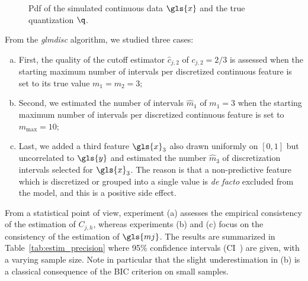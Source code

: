 \begin{figure}[!ht]
\centering
{}
\caption{\label{fig:exp_sim} Pdf of the simulated continuous data $\gls{x}$ and the true quantization $\q$.}
\end{figure}


From the \textit{glmdisc} algorithm, we studied three cases:
\begin{enumerate}[(a)]
    \item First, the quality of the cutoff estimator $\hat{c}_{j,2}$ of $c_{j,2} = 2/3$ is assessed when the starting maximum number of intervals per discretized continuous feature is set to its true value $m_1=m_2= 3$;
    \item Second, we estimated the number of intervals $\hat{m}_1$ of $m_1=3$ when the starting maximum number of intervals per discretized continuous feature is set to $m_{\text{max}} = 10$; 
    \item Last, we added a third feature $\gls{x}_3$ also drawn uniformly on $[0,1]$ but uncorrelated to $\gls{y}$ and estimated the number $\hat{m}_3$ of discretization intervals selected for $\gls{x}_3$. The reason is that a non-predictive feature which is discretized or grouped into a single value is \textit{de facto} excluded from the model, and this is a positive side effect.
\end{enumerate}
From a statistical point of view, experiment (a) assesses the empirical consistency of the estimation of $C_{j,h}$, whereas experiments (b) and (c) focus on the consistency of the estimation of $\gls{mj}$. The results are summarized in Table~\ref{tab:estim_precision} where 95\% confidence intervals (CI~\cite{sun2014fast}) are given, with a varying sample size. Note in particular that the slight underestimation in (b) is a classical consequence of the BIC criterion on small samples. 

